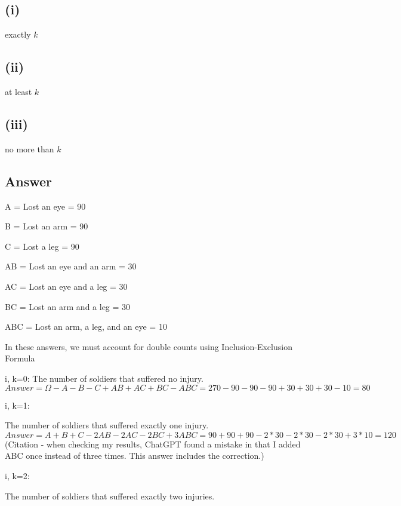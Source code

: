 \documentclass[11pt]{article}
\begin{document}
\subsection*{(i)}

exactly \(k\)


\subsection*{(ii)}

at least \(k\)

\subsection*{(iii)}

no more than \(k\)



\subsection*{Answer}

A = Lost an eye = 90

B = Lost an arm = 90

C = Lost a leg = 90

AB = Lost an eye and an arm = 30

AC = Lost an eye and a leg = 30

BC = Lost an arm and a leg = 30

ABC = Lost an arm, a leg, and an eye = 10

In these answers, we must account for double counts using Inclusion-Exclusion Formula

i, k=0:
The number of soldiers that suffered no injury.
\[
Answer = \Omega - A - B - C + AB + AC + BC - ABC = 270 - 90 - 90 - 90 + 30 + 30 + 30 - 10 = 80 
\]


\vspace{1em}

i, k=1:

The number of soldiers that suffered exactly one injury.
\[
Answer = A + B + C - 2AB - 2AC - 2BC + 3ABC = 90 + 90 + 90 - 2*30 - 2*30 - 2*30 + 3*10 = 120 
\]
(Citation - when checking my results, ChatGPT found a mistake in that I added ABC once instead of three times.
This answer includes the correction.)

\vspace{1em}


i, k=2:

The number of soldiers that suffered exactly two injuries.
\end{document}
